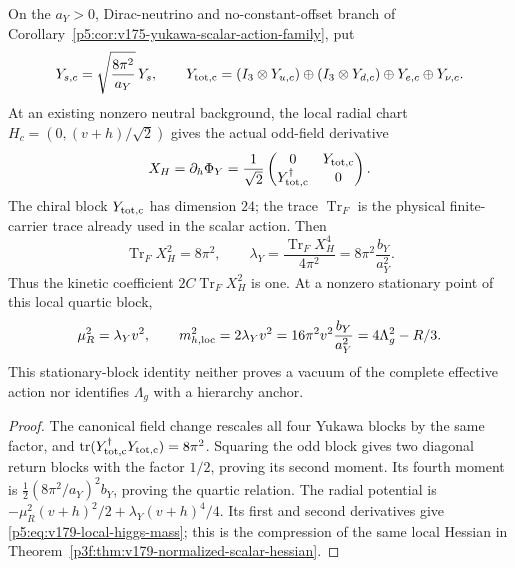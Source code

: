 \documentclass[12pt,a4paper]{article}
\begin{document}
\begin{theorem}
\label{p5:thm:v179-canonical-higgs-direction}
On the \(a_Y>0\), Dirac-neutrino and no-constant-offset branch of
Corollary~\ref{p5:cor:v175-yukawa-scalar-action-family}, put
\[
 Y_{s,c}=\sqrt{\frac{8\pi^2}{a_Y}}\,Y_s,\qquad
 Y_{\rm tot,c}=(I_3\otimes Y_{u,c})\oplus(I_3\otimes Y_{d,c})
                    \oplus Y_{e,c}\oplus Y_{\nu,c}.
\]
At an existing nonzero neutral background, the local radial chart
\(H_c=(0,(v+h)/\sqrt2)\) gives the actual odd-field derivative
\begin{equation}
\label{p5:eq:v179-higgs-odd-direction}
 X_H=\partial_h\Phi_Y
 =\frac1{\sqrt2}
 \begin{pmatrix}0&Y_{\rm tot,c}\\Y_{\rm tot,c}^\dagger&0\end{pmatrix}.
\end{equation}
The chiral block \(Y_{\rm tot,c}\) has dimension \(24\); the trace
\(\operatorname{Tr}_F\) is the physical finite-carrier trace already used
in the scalar action.  Then
\begin{equation}
\label{p5:eq:v179-higgs-moments}
 \operatorname{Tr}_F X_H^2=8\pi^2,\qquad
 \lambda_Y=\frac{\operatorname{Tr}_F X_H^4}{4\pi^2}
           =8\pi^2\frac{b_Y}{a_Y^2}.
\end{equation}
Thus the kinetic coefficient \(2C\operatorname{Tr}_F X_H^2\) is one.
At a nonzero stationary point of this local quartic block,
\begin{equation}
\label{p5:eq:v179-local-higgs-mass}
 \mu_R^2=\lambda_Yv^2,\qquad
 m_{h,\rm loc}^2=2\lambda_Yv^2
 =16\pi^2v^2\frac{b_Y}{a_Y^2}=4\Lambda_g^2-R/3 .
\end{equation}
This stationary-block identity neither proves a vacuum of the complete
effective action nor identifies \(\Lambda_g\) with a hierarchy anchor.
\end{theorem}
\begin{proof}
The canonical field change rescales all four Yukawa blocks by the same
factor, and
\(\operatorname{tr}(Y_{\rm tot,c}^\dagger Y_{\rm tot,c})=8\pi^2\).
Squaring the odd block gives two diagonal return blocks with the factor
\(1/2\), proving its second moment.  Its fourth moment is
\(\tfrac12(8\pi^2/a_Y)^2 b_Y\), proving the quartic relation.
The radial potential is
\(-\mu_R^2(v+h)^2/2+\lambda_Y(v+h)^4/4\).
Its first and second derivatives give
\eqref{p5:eq:v179-local-higgs-mass}; this is the compression of the
same local Hessian in
Theorem~\ref{p3f:thm:v179-normalized-scalar-hessian}.
\end{proof}
\end{document}
